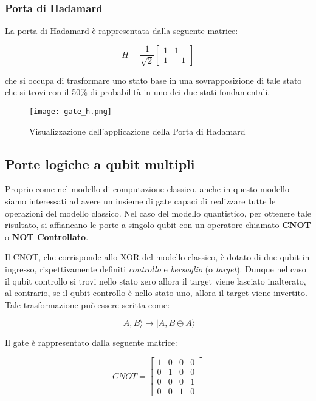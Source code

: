 \subsubsection{Porta di Hadamard}
La porta di Hadamard è rappresentata dalla seguente matrice:

\[
  H
  =
  \frac{1}{\sqrt{2}}
  \begin{bmatrix}
    1 & 1 \\
    1 & -1
  \end{bmatrix}
\]

che si occupa di trasformare uno stato base in una sovrapposizione di tale stato che si trovi con il 50\% di probabilità in uno dei due stati fondamentali.

\begin{figure}[h]
  \centering
  \texttt{[image: gate\_h.png]}
  \caption{Visualizzazione dell'applicazione della Porta di Hadamard}
  \label{fig:gate_h}
\end{figure}

\subsection{Porte logiche a qubit multipli}
Proprio come nel modello di computazione classico, anche in questo modello siamo interessati ad avere un insieme di gate capaci di realizzare tutte le operazioni del modello classico. Nel caso del modello quantistico, per ottenere tale risultato, si affiancano le porte a singolo qubit con un operatore chiamato \textbf{CNOT} o \textbf{NOT Controllato}.

Il CNOT, che corrisponde allo XOR del modello classico, è dotato di due qubit in ingresso, rispettivamente definiti \textit{controllo} e \textit{bersaglio} (o \textit{target}). Dunque nel caso il qubit controllo si trovi nello stato zero allora il target viene lasciato inalterato, al contrario, se il qubit controllo è nello stato uno, allora il target viene invertito. Tale trasformazione può essere scritta come:

\[
  | A, B \rangle \mapsto | A, B \oplus A \rangle
\]

Il gate è rappresentato dalla seguente matrice:

\[
  CNOT = 
  \begin{bmatrix}
    1 & 0 & 0 & 0 \\
    0 & 1 & 0 & 0 \\
    0 & 0 & 0 & 1 \\
    0 & 0 & 1 & 0
  \end{bmatrix}
\]

